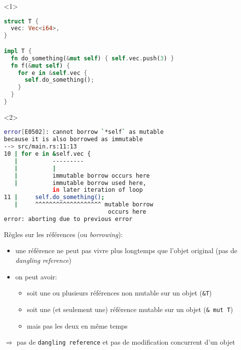 \begin{frame}[fragile]
  \begin{onlyenv}<1>
    \begin{lstlisting}[language=rust]
struct T {
  vec: Vec<i64>,
}

impl T {
  fn do_something(&mut self) { self.vec.push(3) }
  fn f(&mut self) {
    for e in &self.vec {
      self.do_something();
    }
  }
}
    \end{lstlisting}
  \end{onlyenv}
  \begin{onlyenv}<2>
  \begin{lstlisting}[language=bash]
error[E0502]: cannot borrow `*self` as mutable
because it is also borrowed as immutable
--> src/main.rs:11:13
10 | for e in &self.vec {
   |          ---------
   |          |
   |          immutable borrow occurs here
   |          immutable borrow used here,
              in later iteration of loop
11 |     self.do_something();
   |     ^^^^^^^^^^^^^^^^^^^ mutable borrow
                              occurs here
error: aborting due to previous error
    \end{lstlisting}
  \end{onlyenv}
\end{frame}
\begin{frame}
  Règles sur les références (ou \textit{borrowing}):
  \begin{itemize}
  \item une référence ne peut pas vivre plus longtemps que l'objet original (pas
    de \textit{dangling reference})
  \item on peut avoir:
    \begin{itemize}
    \item soit une ou plusieurs références non mutable sur un objet (\texttt{\&T})
    \item soit une (et seulement une) référence mutable sur un objet (\texttt{\&
        mut T})
    \item mais pas les deux en même temps
    \end{itemize}
  \end{itemize}
  $\Rightarrow$ pas de \texttt{dangling reference} et pas de modification
  concurrent d'un objet
\end{frame}